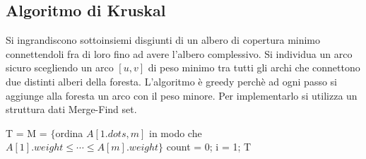 \subsection{Algoritmo di Kruskal}
Si ingrandiscono sottoinsiemi disgiunti di un albero di copertura minimo connettendoli fra di loro fino ad avere l'albero complessivo. Si individua un arco sicuro scegliendo un arco
$[u, v]$ di peso minimo tra tutti gli archi che connettono due distinti alberi della foresta. L'algoritmo \`e greedy perch\`e ad ogni passo si aggiunge alla foresta un arco con il peso
minore. Per implementarlo si utilizza un struttura dati Merge-Find set.\\
\begin{algorithm}[H]
\DontPrintSemicolon
{}






\SetKwFunction{}{}
\SetKwFunction{}{}
\SetKwFunction{}{}
\SetKwFunction{}{}
\SetKwFunction{}{}

\caption{\protect\Set \protect{}}
\Set T = \SetCos{}\;
\Mfset M = \;
$\{$ordina $A[1. dots, m]$ in modo che $A[1].weight\le\cdots\le A[m].weight\}$\;
\Int count = 0;
\Int i = 1;
\Return T\;
\end{algorithm}

